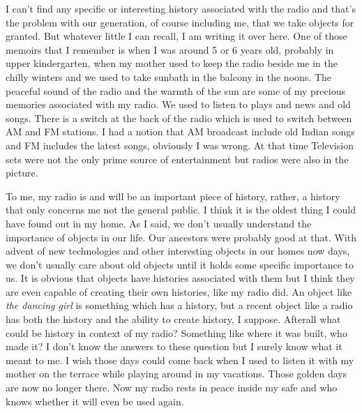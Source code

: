 \documentclass{article}
\begin{document}
{\par I can't find any specific or interesting history associated with the radio and that's the problem with our generation, of course including me, that we take objects for granted. But whatever little I can recall, I am writing it over here. One of those memoirs that I remember is when I was around 5 or 6 years old, probably in upper kindergarten, when my mother used to keep the radio beside me in the chilly winters and we used to take sunbath in the balcony in the noons. The peaceful sound of the radio and the warmth of the sun are some of my precious memories associated with my radio. We used to listen to plays and news and old songs. There is a switch at the back of the radio which is used to switch between AM and FM stations. I had a notion that AM broadcast include old Indian songs and FM includes the latest songs, obviously I was wrong. At that time Television sets were not the only prime source of entertainment but radios were also in the picture.

\par To me, my radio is and will be an important piece of history, rather, a history that only concerns me not the general public. I think it is the oldest thing I could have found out in my home. As I said, we don't usually understand the importance of objects in our life. Our ancestors were probably good at that. With advent of new technologies and other interesting objects in our homes now days, we don't usually care about old objects until it holds some specific importance to us. It is obvious that objects have histories associated with them but I think they are even capable of creating their own histories, like my radio did. An object like \textit{the dancing girl} is something which has a history, but a recent object like a radio has both the history and the ability to create history, I suppose. Afterall what could be history in context of my radio? Something like where it was built, who made it? I don't know the answers to these question but I surely know what it meant to me. I wish those days could come back when I used to listen it with my mother on the terrace while playing around in my vacations. Those golden days are now no longer there. Now my radio rests in peace inside my safe and who knows whether it will even be used again.}
\\
\end{document}
